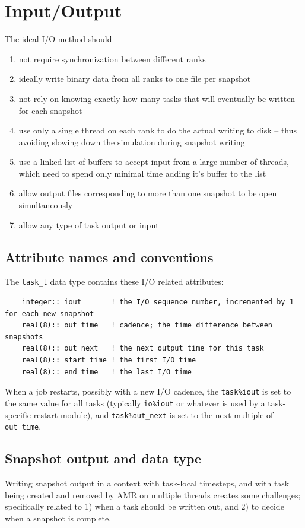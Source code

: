 \documentclass[paper=a4,fontsize=11pt]{scrartcl}
\numberwithin{equation}{section}		%
\numberwithin{figure}{section}			%
\numberwithin{table}{section}				%
\newcommand{\codecolor}{\color{Blue}}
\newcommand{\Code}[1]{{\codecolor\texttt{#1}}}
\begin{document}
\section{Input/Output}
The ideal I/O method should
\begin{enumerate}
    \item not require synchronization between different ranks
    \item ideally write binary data from all ranks to one file per snapshot 
    \item not rely on knowing exactly how many tasks that will eventually be written for each snapshot
    \item use only a single thread on each rank to do the actual writing to disk -- thus avoiding slowing down the simulation during snapshot writing
    \item use a linked list of buffers to accept input from a large number of threads, which need to spend only minimal time adding it's buffer to the list
    \item allow output files corresponding to more than one snapshot to be open simultaneously
    \item allow any type of task output or input
\end{enumerate}

\subsection{Attribute names and conventions}
The \Code{task\_t} data type contains these I/O related attributes:
{\small\codecolor\begin{verbatim}
    integer:: iout       ! the I/O sequence number, incremented by 1 for each new snapshot
    real(8):: out_time   ! cadence; the time difference between snapshots
    real(8):: out_next   ! the next output time for this task
    real(8):: start_time ! the first I/O time
    real(8):: end_time   ! the last I/O time
\end{verbatim}}
When a job restarts, possibly with a new I/O cadence, the \Code{task\%iout} is set to the same value for all tasks (typically \Code{io\%iout} or whatever is used by a task-specific restart module), and \Code{task\%out\_next} is set to the next multiple of \Code{out\_time}.

\subsection{Snapshot output and data type}
Writing snapshot output in a context with task-local timesteps, and with task being created and removed by AMR on multiple threads creates some challenges; specifically related to 1) when a task should be written out, and 2) to decide when a snapshot is complete.
\end{document}
